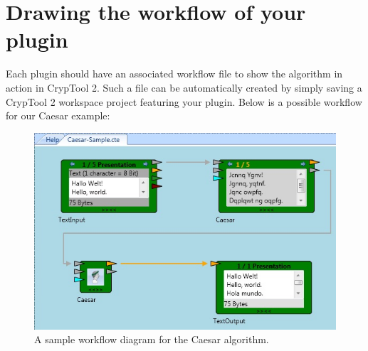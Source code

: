 \section{Drawing the workflow of your plugin}
\label{DrawingTheWorkfloweOfYourPlugin}

Each plugin should have an associated workflow file to show the algorithm in action in CrypTool 2. Such a file can be automatically created by simply saving a CrypTool 2 workspace project featuring your plugin. Below is a possible workflow for our Caesar example:

\begin{figure}[h]
	\centering
		\includegraphics{figures/sample.jpg}
	\caption{A sample workflow diagram for the Caesar algorithm.}
	\label{fig:sample}
\end{figure}